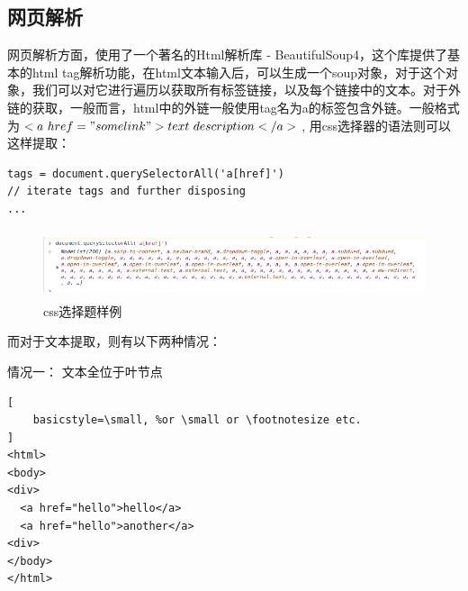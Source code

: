 \documentclass{article}
\begin{document}
\begin{CJK*}{UTF8}{gbsn}
 
\subsection{网页解析}
\qquad 网页解析方面，使用了一个著名的Html解析库 - BeautifulSoup4，这个库提供了基本的html tag解析功能，在html文本输入后，可以生成一个soup对象，对于这个对象，我们可以对它进行遍历以获取所有标签链接，以及每个链接中的文本。对于外链的获取，一般而言，html中的外链一般使用tag名为a的标签包含外链。一般格式为$<a\ href="somelink">text\ description</a>$, 用css选择器的语法则可以这样提取：

\begin{lstlisting}
tags = document.querySelectorAll('a[href]')
// iterate tags and further disposing 
...
\end{lstlisting}
\begin{figure}[H]
\centering
\includegraphics[height=2cm]{query_selector.png}
\caption{css选择题样例}
\end{figure}

而对于文本提取，则有以下两种情况：\newline
\begin{multicols}{2}
\color{blue}
情况一： 文本全位于叶节点
\color{black}
\begin{lstlisting}[
    basicstyle=\small, %or \small or \footnotesize etc.
]
<html>
<body>
<div>
  <a href="hello">hello</a>
  <a href="hello">another</a>
<div>
</body>
</html>
\end{lstlisting}


\end{multicols}
\end{CJK*}
\end{document}
